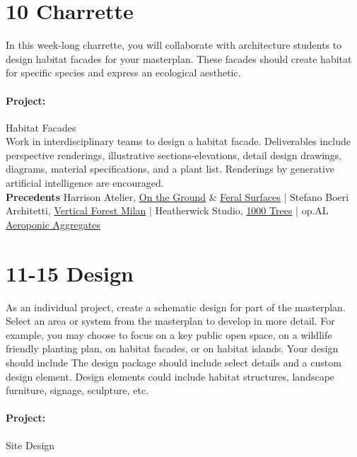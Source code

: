 \documentclass[11pt,article,oneside]{memoir}
\begin{document}
\section{10 Charrette}

In this week-long charrette, you will collaborate with architecture students to design habitat facades for your masterplan. These facades should create habitat for specific species and express an ecological aesthetic. 

\paragraph{Project:} Habitat Facades \\

\noindent
Work in interdisciplinary teams to design a habitat facade. Deliverables include perspective renderings, illustrative sections-elevations, detail design drawings, diagrams, material specifications, and a plant list. Renderings by generative artificial intelligence are encouraged.  
\\

\noindent
\textbf{Precedents}
Harrison Atelier, \href{https://www.harrisonatelier.com/ontheground/}{On the Ground} \& \href{https://www.harrisonatelier.com/barcelonareusingrooftop/}{Feral Surfaces} |
Stefano Boeri Architetti, \href{https://www.stefanoboeriarchitetti.net/en/project/vertical-forest/}{Vertical Forest Milan} | Heatherwick Studio, \href{https://heatherwick.com/project/1000trees/}{1000 Trees} | op.AL \href{https://www.op-al.com/aeroponicaggregates}{Aeroponic Aggregates}


\section{11-15 Design}

As an individual project, create a schematic design for part of the masterplan. Select an area or system from the masterplan to develop in more detail. For example, you may choose to focus on a key public open space, on a wildlife friendly planting plan, on habitat facades, or on habitat islands. Your design should include  The design package should include select details and a custom design element. Design elements could include habitat structures, landscape furniture, signage, sculpture, etc.  

\paragraph{Project:} Site Design \\
\end{document}
